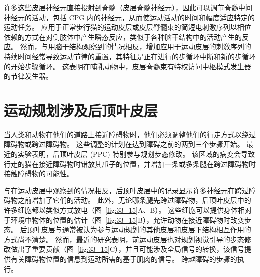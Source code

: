 许多这些皮层神经元直接投射到脊髓（皮层脊髓神经元），因此可以调节脊髓中间神经元的活动，包括 CPG 内的神经元，从而使运动活动的时间和幅度适应特定的运动任务。
应用于正常步行猫的运动皮层或皮层脊髓束的简短电刺激序列以相位依赖的方式在对侧肢体中产生瞬态反应，类似于各种脑干结构中的活动产生的反应。
然而，与用脑干结构观察到的情况相反，增加应用于运动皮层的刺激序列的持续时间经常导致运动节律的重置，其特征是正在进行的步循环中断和新的步循环的开始步骤循环。
这表明在哺乳动物中，皮层脊髓束有特权访问中枢模式发生器的节律发生器。



\section{运动规划涉及后顶叶皮层}

当人类和动物在他们的道路上接近障碍物时，他们必须调整他们的行走方式以绕过障碍物或跨过障碍物。
这些调整的计划在达到障碍之前的两到三个步骤开始。
最近的实验表明，后顶叶皮层 (PPC) 特别参与规划步态修改。
该区域的病变会导致行走的猫在接近障碍物时错放其爪子的位置，并增加一条或多条腿在跨过障碍物时接触障碍物的可能性。


与在运动皮层中观察到的情况相反，后顶叶皮层中的记录显示许多神经元在跨过障碍物之前增加了它们的活动。
此外，无论哪条腿先跨过障碍物，后顶叶皮层中的许多细胞都以类似方式放电（图~\ref{fig:33_15}A、B）。
这些细胞可以提供身体相对于环境中物体的位置的估计（图~\ref{fig:33_15}B），允许动物在接近障碍物时改变步态。
后顶叶皮层与通常被认为参与运动规划的其他皮层和皮层下结构相互作用的方式尚不清楚。
然而，最近的研究表明，前运动皮层也对规划视觉引导的步态修改做出了重要贡献（图~\ref{fig:33_15}C），并且可能涉及全局信号的转换，该信号提供有关障碍物位置的信息到运动所需的基于肌肉的信号。
跨越障碍的步骤的执行。


